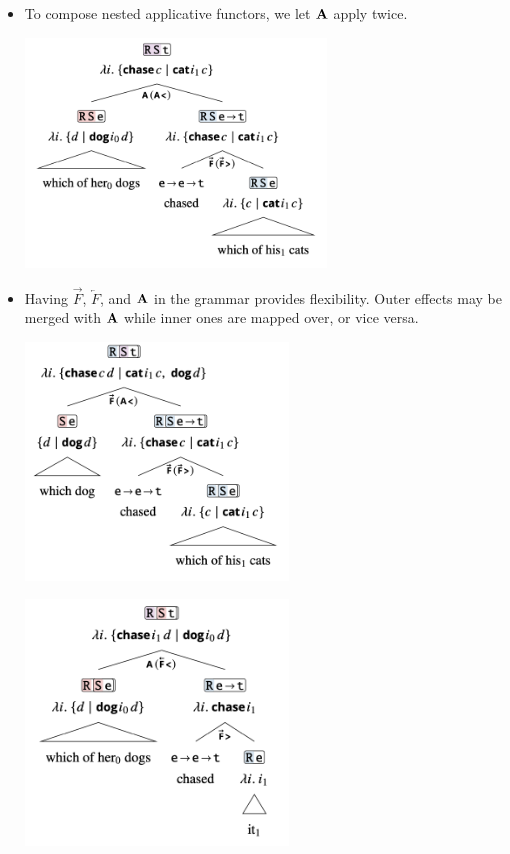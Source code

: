 \documentclass{article}
\begin{document}
\pagebreak

\begin{itemize}
  \item To compose nested applicative functors, we let $\bf A$ apply twice.
    \begin{exe}
      \ex \hfill
        \begin{center}
          \includegraphics[width=8cm]{clips/32.png}
        \end{center}
    \end{exe}
  \item Having $\overrightarrow{F}$, $\overleftarrow{F}$, and $\bf A$ in the grammar provides
    flexibility. Outer effects may be merged with $\bf A$ while inner ones are mapped over, or vice versa.
    \begin{exe}
      \ex \hfill
        \begin{center}
          \includegraphics[width=7cm]{clips/33.png}
        \end{center}
      \ex \hfill
        \begin{center}
          \includegraphics[width=7cm]{clips/34.png}
        \end{center}
    \end{exe}
  
\end{itemize}
\end{document}
